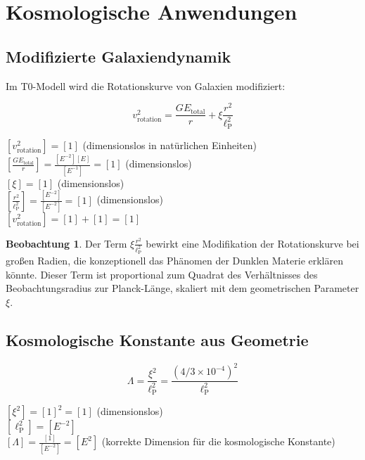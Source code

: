 \documentclass[12pt,a4paper]{article}
\newcommand{\lp}{\ell_{\text{P}}}
\theoremstyle{definition}
\newtheorem{beobachtung}{Beobachtung}
\begin{document}
	\section{Kosmologische Anwendungen}
	
	\subsection{Modifizierte Galaxiendynamik}
	
	Im T0-Modell wird die Rotationskurve von Galaxien modifiziert:
	
	\begin{equation}
		v_{\text{rotation}}^2 = \frac{GE_{\text{total}}}{r} + \xi \frac{r^2}{\lp^2}
	\end{equation}
	
	\begin{einheitencheck}
		$[v_{\text{rotation}}^2] = [1]$ (dimensionslos in natürlichen Einheiten)\\
		$[\frac{GE_{\text{total}}}{r}] = \frac{[E^{-2}][E]}{[E^{-1}]} = [1]$ (dimensionslos)\\
		$[\xi] = [1]$ (dimensionslos)\\
		$[\frac{r^2}{\lp^2}] = \frac{[E^{-2}]}{[E^{-2}]} = [1]$ (dimensionslos)\\
		$[v_{\text{rotation}}^2] = [1] + [1] = [1]$ \checkmark
	\end{einheitencheck}
	
	\begin{beobachtung}
		Der Term $\xi \frac{r^2}{\lp^2}$ bewirkt eine Modifikation der Rotationskurve bei großen Radien, die konzeptionell das Phänomen der Dunklen Materie erklären könnte. Dieser Term ist proportional zum Quadrat des Verhältnisses des Beobachtungsradius zur Planck-Länge, skaliert mit dem geometrischen Parameter $\xi$.
	\end{beobachtung}
	
	\subsection{Kosmologische Konstante aus Geometrie}
	
	\begin{equation}
		\Lambda = \frac{\xi^2}{\lp^2} = \frac{(4/3 \times 10^{-4})^2}{\lp^2}
	\end{equation}
	
	\begin{einheitencheck}
		$[\xi^2] = [1]^2 = [1]$ (dimensionslos)\\
		$[\lp^2] = [E^{-2}]$\\
		$[\Lambda] = \frac{[1]}{[E^{-2}]} = [E^2]$ (korrekte Dimension für die kosmologische Konstante) \checkmark
	\end{einheitencheck}
	
\end{document}
